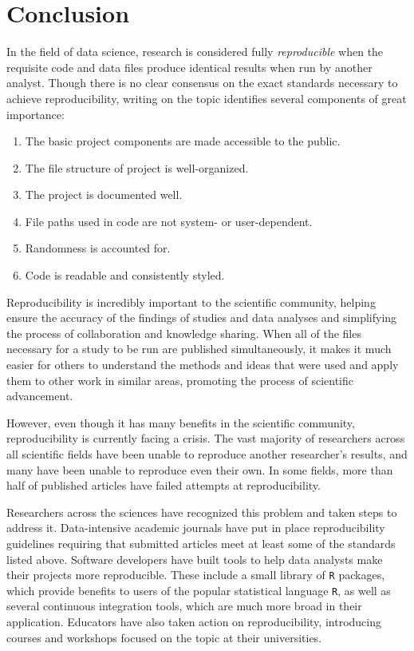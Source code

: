 \documentclass[12pt,twoside]{reedthesis}
\begin{document}
\hypertarget{conclusion}{%
\chapter*{Conclusion}\label{conclusion}}

In the field of data science, research is considered fully \emph{reproducible} when the requisite code and data files produce identical results when run by another analyst. Though there is no clear consensus on the exact standards necessary to achieve reproducibility, writing on the topic identifies several components of great importance:
\begin{enumerate}
\def\labelenumi{\arabic{enumi}.}
\item
  The basic project components are made accessible to the public.
\item
  The file structure of project is well-organized.
\item
  The project is documented well.
\item
  File paths used in code are not system- or user-dependent.
\item
  Randomness is accounted for.
\item
  Code is readable and consistently styled.
\end{enumerate}
Reproducibility is incredibly important to the scientific community, helping ensure the accuracy of the findings of studies and data analyses and simplifying the process of collaboration and knowledge sharing. When all of the files necessary for a study to be run are published simultaneously, it makes it much easier for others to understand the methods and ideas that were used and apply them to other work in similar areas, promoting the process of scientific advancement.

However, even though it has many benefits in the scientific community, reproducibility is currently facing a crisis. The vast majority of researchers across all scientific fields have been unable to reproduce another researcher's results, and many have been unable to reproduce even their own. In some fields, more than half of published articles have failed attempts at reproducibility.

Researchers across the sciences have recognized this problem and taken steps to address it. Data-intensive academic journals have put in place reproducibility guidelines requiring that submitted articles meet at least some of the standards listed above. Software developers have built tools to help data analysts make their projects more reproducible. These include a small library of \texttt{R} packages, which provide benefits to users of the popular statistical language \texttt{R}, as well as several continuous integration tools, which are much more broad in their application. Educators have also taken action on reproducibility, introducing courses and workshops focused on the topic at their universities.
\end{document}
